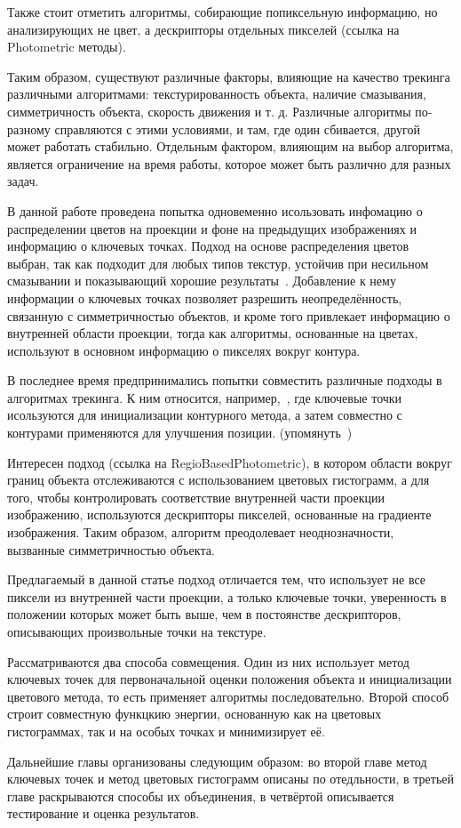 Также стоит отметить алгоритмы, собирающие попиксельную информацию, но
анализирующих не цвет, а дескрипторы отдельных пикселей (ссылка на Photometric
методы).

Таким образом, существуют различные факторы, влияющие на качество трекинга
различными алгоритмами: текстурированность объекта, наличие смазывания,
симметричность объекта, скорость движения и т. д.
Различные алгоритмы по-разному справляются с этими условиями, и там, где один
сбивается, другой может работать стабильно.
Отдельным фактором, влияющим на выбор алгоритма, является ограничение на время
работы, которое может быть различно для разных задач.

В данной работе проведена попытка одновеменно исользовать инфомацию о
распределении цветов на проекции и фоне на предыдущих изображениях и информацию
о ключевых точках.
Подход на основе распределения цветов выбран, так как подходит для любых типов
текстур, устойчив при несильном смазывании и показывающий хорошие
результаты~\cite{Tjaden2018}.
Добавление к нему информации о ключевых точках позволяет разрешить
неопределённость, связанную с симметричностью объектов, и кроме того привлекает
информацию о внутренней области проекции, тогда как алгоритмы, основанные на
цветах, используют в основном информацию о пикселях вокруг контура.

В последнее время предпринимались попытки совместить различные подходы в
алгоритмах трекинга.
К ним относится, например,~\cite{Bugaev_2018_ECCV}, где ключевые точки
исользуются для инициализации контурного метода, а затем совместно с контурами
применяются для улучшения позиции.
(упомянуть~\cite{ColorFeature2018})

Интересен подход (ссылка на RegioBasedPhotometric), в котором области вокруг
границ объекта отслеживаются с использованием цветовых гистограмм, а для того,
чтобы контролировать соответствие внутренней части проекции изображению,
используются дескрипторы пикселей, основанные на градиенте изображения.
Таким образом, алгоритм преодолевает неоднозначности, вызванные симметричностью
объекта.


Предлагаемый в данной статье подход отличается тем, что использует не все
пиксели из внутренней части проекции, а только ключевые точки, уверенность в
положении которых может быть выше, чем в постоянстве дескрипторов, описывающих
произвольные точки на текстуре.

Рассматриваются два способа совмещения.
Один из них использует метод ключевых точек для первоначальной оценки положения
объекта и инициализации цветового метода, то есть применяет алгоритмы
последовательно.
Второй способ строит совместную функцкию энергии, основанную как на цветовых
гистограммах, так и на особых точках и минимизирует её.

Дальнейшие главы организованы следующим образом: во второй главе метод ключевых
точек и метод цветовых гистограмм описаны по отедльности, в третьей главе
раскрываются способы их объединения, в четвёртой описывается тестирование и
оценка результатов.
